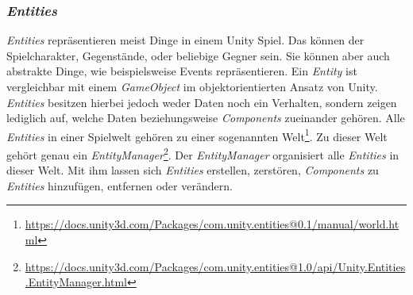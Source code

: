 \subsubsection[\textit{Entities}]{\textit{Entities}}\textit{Entities} repräsentieren meist Dinge in einem Unity Spiel. Das können der Spielcharakter, Gegenstände, oder beliebige Gegner sein. Sie können aber auch abstrakte Dinge, wie beispielsweise Events repräsentieren. Ein \textit{Entity} ist vergleichbar mit einem \textit{GameObject} im objektorientierten Ansatz von Unity. \textit{Entities} besitzen hierbei jedoch weder Daten noch ein Verhalten, sondern zeigen lediglich auf, welche Daten beziehungsweise \textit{Components} zueinander gehören. Alle \textit{Entities} in einer Spielwelt gehören zu einer sogenannten Welt\footnote{\url{https://docs.unity3d.com/Packages/com.unity.entities@0.1/manual/world.html}}. Zu dieser Welt gehört genau ein \textit{EntityManager}\footnote{\url{https://docs.unity3d.com/Packages/com.unity.entities@1.0/api/Unity.Entities.EntityManager.html}}. Der \textit{EntityManager} organisiert alle \textit{Entities} in dieser Welt. Mit ihm lassen sich \textit{Entities} erstellen, zerstören, \textit{Components} zu \textit{Entities} hinzufügen, entfernen oder verändern.
